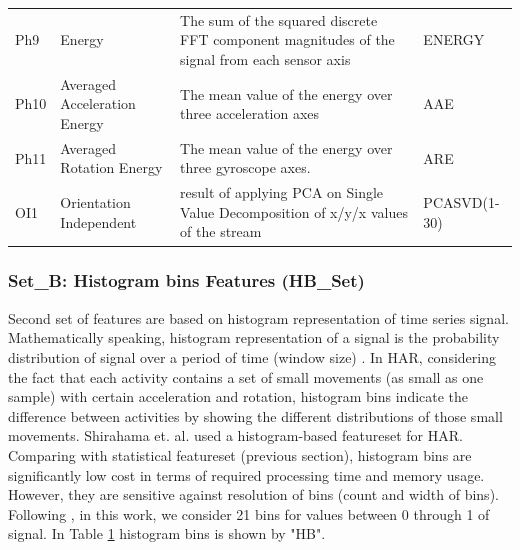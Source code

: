 \documentclass[journal,article,submit,moreauthors,pdftex]{Definitions/mdpi}
\begin{document}
\begin{table}[H]
\begin{tabular}{p{0.9cm}p{5cm}p{7cm}p{1.3cm}}
		Ph9&Energy&{\scriptsize The sum of the squared discrete FFT component magnitudes of the signal from each sensor axis} & ENERGY \\
		Ph10&Averaged Acceleration Energy&{\scriptsize The mean value of the energy over three acceleration axes} & AAE \\
		Ph11&Averaged Rotation Energy&{\scriptsize The mean value of the energy over three gyroscope axes. } & ARE \\
		OI1&Orientation Independent&{\scriptsize result of applying PCA on Single Value Decomposition  of x/y/x values of the stream } & PCASVD(1-30) \\
		\bottomrule
	\end{tabular}
	\label{features_table}
\end{table}


\subsubsection{Set\_B: Histogram bins Features (HB\_Set)}
Second set of features are based on histogram representation of time series signal. Mathematically speaking, histogram representation of a signal is the probability distribution of signal over a period of time (window size) \cite{zardoshti1995emg}. In HAR, considering the fact that each activity contains a set of small movements (as small as one sample) with certain acceleration and rotation, histogram bins indicate the difference between activities by showing the different distributions of those small movements. Shirahama et. al.\cite{shirahama2016codebook} used a histogram-based featureset for HAR. Comparing with statistical featureset (previous section), histogram bins are significantly low cost in terms of required processing time and memory usage\cite{Sarbishei2019platform}. However, they are sensitive against resolution of bins (count and width of bins). Following \cite{xi2017evaluation}, in this work, we consider 21 bins for values between 0 through 1 of signal. In Table \ref{features_table} histogram bins is shown by "HB".
\end{document}

